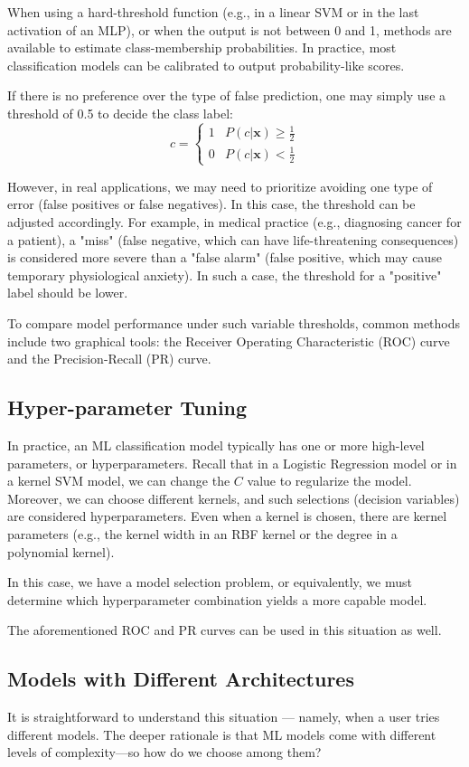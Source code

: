 \documentclass[12pt]{article}
\begin{document}
When using a hard-threshold function (e.g., in a linear SVM or in the last activation of an MLP), or when the output is not between 0 and 1, methods are available to estimate class-membership probabilities. In practice, most classification models can be calibrated to output probability-like scores.

If there is no preference over the type of false prediction, one may simply use a threshold of 0.5 to decide the class label:
\[
c = \begin{cases} 
      1 & P(c|\mathbf{x}) \geq \frac{1}{2} \\
      0 & P(c|\mathbf{x}) < \frac{1}{2} 
      \end{cases}
\]

However, in real applications, we may need to prioritize avoiding one type of error (false positives or false negatives). In this case, the threshold can be adjusted accordingly. For example, in medical practice (e.g., diagnosing cancer for a patient), a "miss" (false negative, which can have life-threatening consequences) is considered more severe than a "false alarm" (false positive, which may cause temporary physiological anxiety). In such a case, the threshold for a "positive" label should be lower.

To compare model performance under such variable thresholds, common methods include two graphical tools: the Receiver Operating Characteristic (ROC) curve and the Precision-Recall (PR) curve.

\subsection{Hyper-parameter Tuning}
In practice, an ML classification model typically has one or more high-level parameters, or hyperparameters. Recall that in a Logistic Regression model or in a kernel SVM model, we can change the \(C\) value to regularize the model. Moreover, we can choose different kernels, and such selections (decision variables) are considered hyperparameters. Even when a kernel is chosen, there are kernel parameters (e.g., the kernel width in an RBF kernel or the degree in a polynomial kernel).

In this case, we have a model selection problem, or equivalently, we must determine which hyperparameter combination yields a more capable model.

The aforementioned ROC and PR curves can be used in this situation as well.

\subsection{Models with Different Architectures}
It is straightforward to understand this situation — namely, when a user tries different models. The deeper rationale is that ML models come with different levels of complexity---so how do we choose among them?
\end{document}
